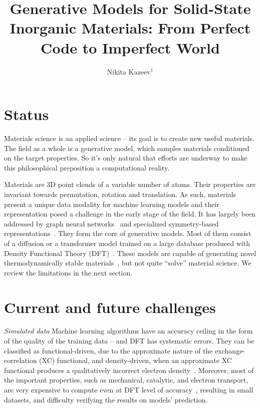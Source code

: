 \documentclass{iopjournal}
\begin{document}
\title{Generative Models for Solid-State Inorganic Materials: From Perfect Code to Imperfect World}
\author{Nikita Kazeev$^1$}



\section*{Status} 
Materials science is an applied science -- its goal is to create new useful materials. The field as a whole is a generative model, which samples materials conditioned on the target properties. So it's only natural that efforts are underway to make this philosophical preposition a computational reality.

Materials are 3D point clouds of a variable number of atoms. Their properties are invariant towards permutation, rotation and translation. As such, materials present a unique data modality for machine learning models and their representation posed a challenge in the early stage of the field. It has largely been addressed by graph neural networks~\cite{PhysRevLett.120.145301} and specialized symmetry-based representations~\cite{goodall2022rapid}. They form the core of generative models. Most of them consist of a diffusion or a transformer model trained on a large database produced with Density Functional Theory (DFT)~\cite{horton2025accelerated, ghahremanpour2018alexandria, saal2013materials}. These models are capable of generating novel thermodynamically stable materials~\cite{zeni2025generative, okabe2025structural}, but not quite ``solve'' material science. We review the limitations in the next section.

\section*{Current and future challenges}
\textit{Simulated data} Machine learning algorithms have an accuracy ceiling in the form of the quality of the training data -- and DFT has systematic errors. They can be classified as functional-driven, due to the approximate nature of the exchange-correlation (XC) functional, and density-driven, when an approximate XC functional produces a qualitatively incorrect electron density~\cite{PhysRevLett.111.073003}. Moreover, most of the important properties, such as mechanical, catalytic, and electron transport, are very expensive to compute even at DFT level of accuracy~\cite{yamazaki2025multipropertydirectedgenerativedesign}, resulting in small datasets, and difficulty verifying the results on models' prediction.
\end{document}
